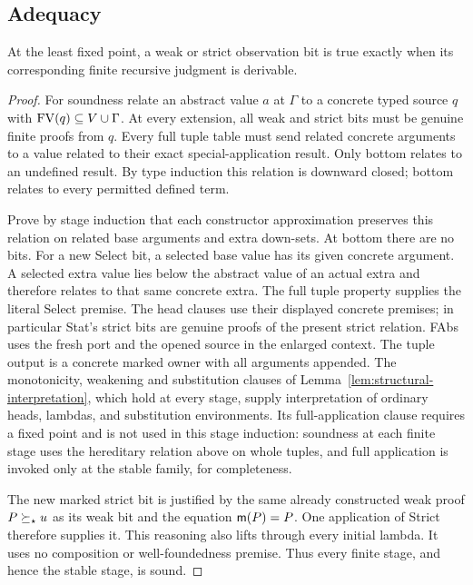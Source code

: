 \subsection{Adequacy}
\begin{theorem}\label{thm:adequacy}
At the least fixed point, a weak or strict observation bit is true
exactly when its corresponding finite recursive judgment is derivable.
\end{theorem}
\begin{proof}
For soundness relate an abstract value $a$ at $\Gamma$ to a concrete
typed source $q$ with $\operatorname{FV}(q)\subseteq V\cup\Gamma$. At every extension,
all weak and strict bits must be genuine finite proofs from $q$.
Every full tuple table must send related concrete arguments to a value
related to their exact special-application result. Only bottom relates
to an undefined result. By type induction this relation is downward
closed; bottom relates to every permitted defined term.

Prove by stage induction that each constructor approximation preserves
this relation on related base arguments and extra down-sets. At bottom
there are no bits. For a new Select bit, a selected base value has its
given concrete argument. A selected extra value lies below the abstract
value of an actual extra and therefore relates to that same concrete
extra. The full tuple property supplies the literal Select premise.
The head clauses use their displayed concrete premises; in particular
Stat's strict bits are genuine proofs of the present strict relation.
FAbs uses the fresh port and the opened source in the enlarged context.
The tuple output is a concrete marked owner with all arguments appended.
The monotonicity, weakening and substitution clauses of
Lemma~\ref{lem:structural-interpretation}, which hold at every stage,
supply interpretation of ordinary heads, lambdas, and substitution
environments. Its full-application clause requires a fixed point and
is not used in this stage induction: soundness at each finite stage
uses the hereditary relation above on whole tuples, and full
application is invoked only at the stable family, for completeness.

The new marked strict bit is justified by the same already constructed
weak proof $P\succeq_\star u$ as its weak bit and the equation $\mathsf m(P)=P$.
One application of Strict therefore supplies it. This reasoning also
lifts through every initial lambda. It uses no composition or
well-foundedness premise. Thus every finite stage, and hence the stable
stage, is sound.


\end{proof}
